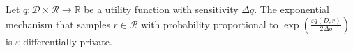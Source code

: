 Let $q: \mathcal{D} \times \mathcal{R} \to \mathbb{R}$ be a utility function with sensitivity $\Delta q$.
The exponential mechanism that samples $r \in \mathcal{R}$ with probability proportional to
$\exp\!\left( \frac{\varepsilon q(D,r)}{2\Delta q} \right)$
is $\varepsilon$-differentially private.
